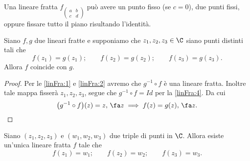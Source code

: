 \begin{pr}\label{linFra:4}
	Una lineare fratta \(f_{\left(\begin{smallmatrix}a & b\\c & d\end{smallmatrix}\right)}\) può avere un punto fisso (se \(c=0\)), due punti fissi, oppure fissare tutto il piano risultando l'identità.
\end{pr}

\begin{pr}\label{linFra:5}
	Siano \(f,g\) due lineari fratte e supponiamo che \(z_1,z_2,z_3\in \C\) siano punti distinti tali che
	\[
		f(z_1) = g(z_1); \qquad f(z_2) = g(z_2); \qquad f(z_3) = g(z_3).
	\]
	Allora \(f\) coincide con \(g\).
\end{pr}

\begin{proof}
	Per le \autoref{linFra:1} e \autoref{linFra:2} avremo che \(g^{-1}\circ f\) è una lineare fratta.
	Inoltre tale mappa fisserà \(z_1,z_2,z_3\), segue che \(g^{-1}\circ f = Id\) per la \autoref{linFra:4}.
	Da cui
	\[
		\big(g^{-1}\circ f\big)(z) = z,\,\fa z \implies f(z) = g(z),\,\fa z.\qedhere
	\]
\end{proof}

\begin{pr}\label{linFra:6}
	Siano \((z_1,z_2,z_3)\) e \((w_1,w_2,w_3)\) due triple di punti in \(\C\).
	Allora esiste un'unica lineare fratta \(f\) tale che
	\[
		f(z_1) = w_1; \qquad f(z_2) = w_2; \qquad f(z_3) = w_3.
	\]
\end{pr}

